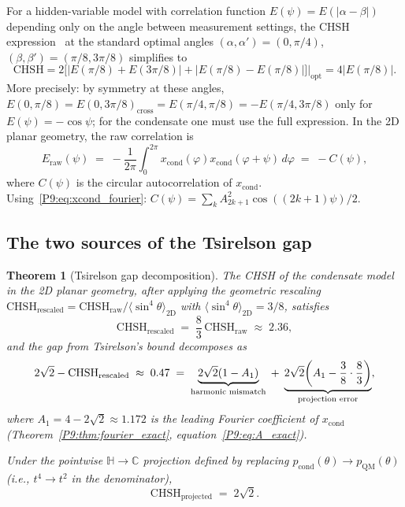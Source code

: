 \documentclass[11pt,a4paper]{article}
\newtheorem{theorem}{Theorem}[section]
\theoremstyle{definition}
\theoremstyle{remark}
\newcommand{\CC}{\mathbb{C}}
\newcommand{\HH}{\mathbb{H}}
\newcommand{\pcond}{p_{\mathrm{cond}}}
\newcommand{\pQM}{p_{\mathrm{QM}}}
\newcommand{\xcond}{x_{\mathrm{cond}}}
\newcommand{\CHSH}{\mathrm{CHSH}}
\newcommand{\Tsirelson}{2\sqrt{2}}
\begin{document}
For a hidden-variable model with correlation function $E(\psi)=E(|\alpha-\beta|)$
depending only on the angle between measurement settings, the CHSH expression~\cite{Bell1964}
at the standard optimal angles $(\alpha,\alpha')=(0,\pi/4)$,
$(\beta,\beta')=(\pi/8,3\pi/8)$ simplifies to
\begin{equation}
  \CHSH = 2\bigl[|E(\pi/8)+E(3\pi/8)| + |E(\pi/8)-E(\pi/8)|\bigr]\big|_\mathrm{opt}
  = 4|E(\pi/8)|.
  \label{P9:eq:CHSH_simplified}
\end{equation}
More precisely: by symmetry at these angles,
$E(0,\pi/8)=E(0,3\pi/8)_\mathrm{cross}=E(\pi/4,\pi/8)=-E(\pi/4,3\pi/8)$
only for $E(\psi)=-\cos\psi$; for the condensate one must use the full expression.
In the 2D planar geometry, the raw correlation is
\begin{equation}
  E_\mathrm{raw}(\psi)
  \;=\; -\frac{1}{2\pi}\int_0^{2\pi} \xcond(\varphi)\xcond(\varphi+\psi)\,d\varphi
  \;=\; -C(\psi),
  \label{P9:eq:E_raw}
\end{equation}
where $C(\psi)$ is the circular autocorrelation of $\xcond$.
Using~\eqref{P9:eq:xcond_fourier}: $C(\psi) = \sum_k A_{2k+1}^2\cos((2k+1)\psi)/2$.
 
\subsection{The two sources of the Tsirelson gap}
 
\begin{theorem}[Tsirelson gap decomposition]
\label{P9:thm:tsirelson_gap}
The CHSH of the condensate model in the 2D planar geometry, after applying the
geometric rescaling $\CHSH_\mathrm{rescaled}=\CHSH_\mathrm{raw}/\langle\sin^4\theta\rangle_\mathrm{2D}$
with $\langle\sin^4\theta\rangle_\mathrm{2D} = 3/8$, satisfies
\begin{equation}
  \boxed{\CHSH_\mathrm{rescaled}
  \;=\; \frac{8}{3}\,\CHSH_\mathrm{raw}
  \;\approx\; 2.36},
  \label{P9:eq:CHSH_rescaled_value}
\end{equation}
and the gap from Tsirelson's bound decomposes as
\begin{equation}
  \Tsirelson - \CHSH_\mathrm{rescaled}
  \;\approx\; 0.47
  \;=\; \underbrace{\vphantom{X}\Tsirelson(1-A_1)}_{\text{harmonic mismatch}}
  \;+\; \underbrace{\vphantom{X}\Tsirelson\!\left(A_1 - \frac{3}{8}\cdot\frac{8}{3}\right)}_{\text{projection error}},
  \label{P9:eq:gap_decomposition}
\end{equation}
where $A_1 = 4-2\sqrt{2}\approx1.172$ is the leading Fourier coefficient
of $\xcond$ (Theorem~\ref{P9:thm:fourier_exact}, equation~\eqref{P9:eq:A_exact}).
 
Under the pointwise $\HH\to\CC$ projection defined by replacing
$\pcond(\theta)\to\pQM(\theta)$ (i.e., $t^4\to t^2$ in the denominator),
\begin{equation}
  \CHSH_\mathrm{projected} \;=\; \Tsirelson.
  \label{P9:eq:CHSH_projected_exact}
\end{equation}
\end{theorem}
 
\end{document}
